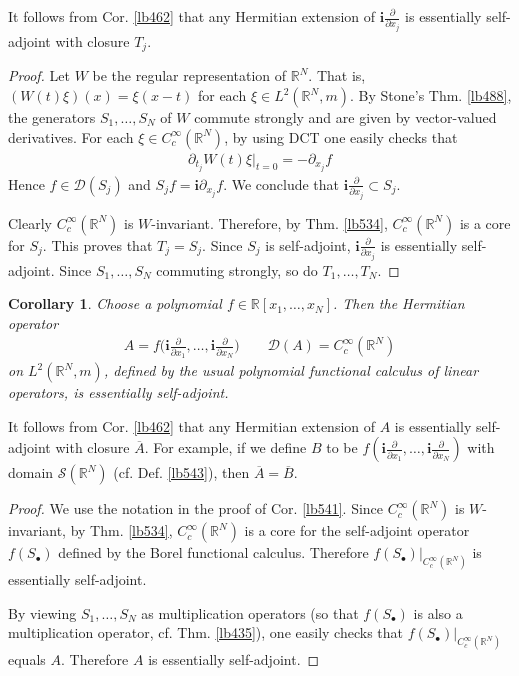 \documentclass[12pt,b5paper,notitlepage]{article}
\theoremstyle{definition}
\theoremstyle{plain}
\newtheorem{co}[df]{Corollary}
\newcommand{\ovl}{\overline}
\newcommand{\Dom}{\mathscr{D}}
\newcommand{\im}{\mathbf{i}}
\newcommand{\blt}{\bullet}
\newcommand{\Rbb}{\mathbb R}
\newcommand{\MS}{\mathcal S}
\numberwithin{equation}{section}
\begin{document}
It follows from Cor. \ref{lb462} that any Hermitian extension of $\im\frac\partial{\partial x_j}$ is essentially self-adjoint with closure $T_j$.

\begin{proof}
Let $W$ be the regular representation of $\Rbb^N$. That is, $(W(t)\xi)(x)=\xi(x-t)$ for each $\xi\in L^2(\Rbb^N,m)$. By Stone's Thm. \ref{lb488}, the generators $S_1,\dots,S_N$ of $W$ commute strongly and are given by vector-valued derivatives. For each $\xi\in C_c^\infty(\Rbb^N)$, by using DCT one easily checks that
\begin{align*}
\partial_{t_j}W(t)\xi\big|_{t=0}=-\partial_{x_j}f
\end{align*}
Hence $f\in\Dom(S_j)$ and $S_jf=\im\partial_{x_j}f$. We conclude that $\im\frac\partial{\partial x_j}\subset S_j$. 

Clearly $C_c^\infty(\Rbb^N)$ is $W$-invariant. Therefore, by Thm. \ref{lb534}, $C_c^\infty(\Rbb^N)$ is a core for $S_j$. This proves that $T_j=S_j$. Since $S_j$ is self-adjoint, $\im\frac\partial{\partial x_j}$ is essentially self-adjoint. Since $S_1,\dots,S_N$ commuting strongly, so do $T_1,\dots,T_N$.
\end{proof}

\begin{co}\label{lb542}
Choose a polynomial $f\in\Rbb[x_1,\dots,x_N]$. Then the Hermitian operator 
\begin{align*}
A=f\Big(\im\frac\partial{\partial x_1},\dots,\im\frac\partial{\partial x_N}\Big)\qquad\Dom(A)=C_c^\infty(\Rbb^N)
\end{align*}
on $L^2(\Rbb^N,m)$, defined by the usual polynomial functional calculus of linear operators, is essentially self-adjoint.
\end{co}

It follows from Cor. \ref{lb462} that any Hermitian extension of $A$ is essentially self-adjoint with closure $\ovl A$. For example, if we define $B$ to be $f(\im\frac\partial{\partial x_1},\dots,\im\frac\partial{\partial x_N})$ with domain $\MS(\Rbb^N)$ (cf. Def. \ref{lb543}), then $\ovl A=\ovl B$.

\begin{proof}
We use the notation in the proof of Cor. \ref{lb541}. Since $C_c^\infty(\Rbb^N)$ is $W$-invariant, by Thm. \ref{lb534}, $C_c^\infty(\Rbb^N)$ is a core for the self-adjoint operator $f(S_\blt)$ defined by the Borel functional calculus. Therefore $f(S_\blt)|_{C_c^\infty(\Rbb^N)}$ is essentially self-adjoint.

By viewing $S_1,\dots,S_N$ as multiplication operators (so that $f(S_\blt)$ is also a multiplication operator, cf. Thm. \ref{lb435}), one easily checks that $f(S_\blt)|_{C_c^\infty(\Rbb^N)}$ equals $A$. Therefore $A$ is essentially self-adjoint.
\end{proof}
\end{document}
